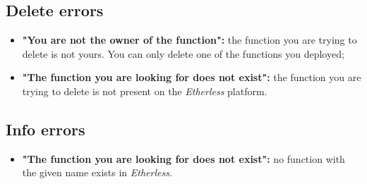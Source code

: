   \subsection{Delete errors}
  \begin{itemize}
    \item \textbf{"You are not the owner of the function":} the function you are trying to delete is not yours. You can only delete one of the functions you deployed;
    \item \textbf{"The function you are looking for does not exist":} the function you are trying to delete is not present on the \textit{Etherless} platform.
  \end{itemize}
  \subsection{Info errors}
  \begin{itemize}
    \item \textbf{"The function you are looking for does not exist":} no function with the given name exists in \textit{Etherless}.
  \end{itemize}
